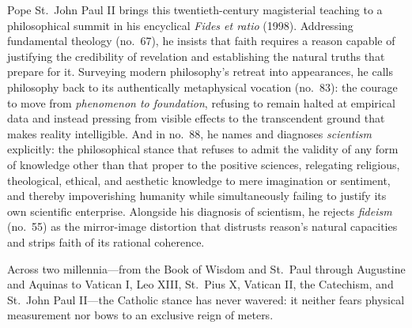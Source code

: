 Pope St.\ John Paul II brings this twentieth-century magisterial teaching to a philosophical summit in his encyclical \emph{Fides et ratio} (1998). Addressing fundamental theology (no.\ 67), he insists that faith requires a reason capable of justifying the credibility of revelation and establishing the natural truths that prepare for it. Surveying modern philosophy's retreat into appearances, he calls philosophy back to its authentically metaphysical vocation (no.\ 83): the courage to move from \emph{phenomenon to foundation}, refusing to remain halted at empirical data and instead pressing from visible effects to the transcendent ground that makes reality intelligible. And in no.\ 88, he names and diagnoses \emph{scientism} explicitly: the philosophical stance that refuses to admit the validity of any form of knowledge other than that proper to the positive sciences, relegating religious, theological, ethical, and aesthetic knowledge to mere imagination or sentiment, and thereby impoverishing humanity while simultaneously failing to justify its own scientific enterprise. Alongside his diagnosis of scientism, he rejects \emph{fideism} (no.\ 55) as the mirror-image distortion that distrusts reason's natural capacities and strips faith of its rational coherence.

Across two millennia---from the Book of Wisdom and St.\ Paul through Augustine and Aquinas to Vatican I, Leo XIII, St.\ Pius X, Vatican II, the Catechism, and St.\ John Paul II---the Catholic stance has never wavered: it neither fears physical measurement nor bows to an exclusive reign of meters.
